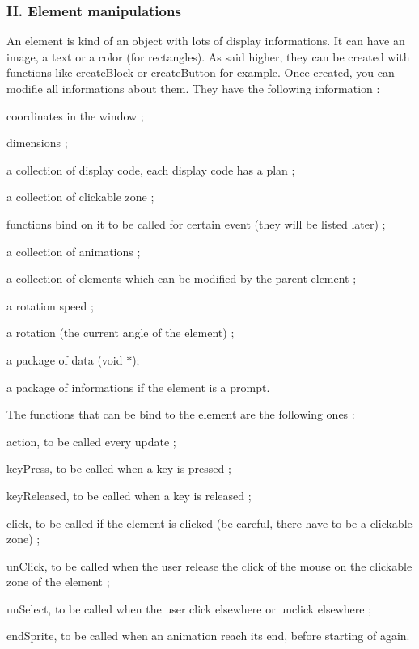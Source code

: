 \subsubsection*{II. Element manipulations}

An element is kind of an object with lots of display informations. It can have an image, a text or a color (for rectangles). As said higher, they can be created with functions like create\+Block or create\+Button for example. Once created, you can modifie all informations about them. They have the following information \+:
\begin{DoxyItemize}
\item coordinates in the window ;
\item dimensions ;
\item a collection of display code, each display code has a plan ;
\item a collection of clickable zone ;
\item functions bind on it to be called for certain event (they will be listed later) ;
\item a collection of animations ;
\item a collection of elements which can be modified by the parent element ;
\item a rotation speed ;
\item a rotation (the current angle of the element) ;
\item a package of data (void $\ast$);
\item a package of informations if the element is a prompt. ~\newline
~\newline


The functions that can be bind to the element are the following ones \+:
\item action, to be called every update ;
\item key\+Press, to be called when a key is pressed ;
\item key\+Released, to be called when a key is released ;
\item click, to be called if the element is clicked (be careful, there have to be a clickable zone) ;
\item un\+Click, to be called when the user release the click of the mouse on the clickable zone of the element ;
\item un\+Select, to be called when the user click elsewhere or unclick elsewhere ;
\item end\+Sprite, to be called when an animation reach its end, before starting of again. ~\newline
~\newline



\end{DoxyItemize}

